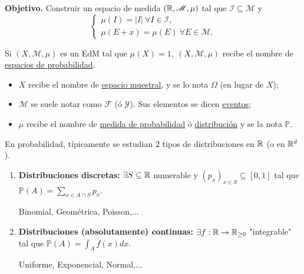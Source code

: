 \noindent \textbf{Objetivo.} Construir un espacio de medida $(\mathbb{R},\mathscr{M},\mu)$ tal que $\mathcal{I} \subseteq \mathscr{M}$ y
\[ \begin{cases}
	\mu(I) = |I|\ \forall I \in \mathcal{I}, \\
	\mu(E+x) = \mu(E) \ \forall E \in \mathscr{M}.
\end{cases} \]

\begin{eg}
	Si $(X,\mathscr{M},\mu)$ es un EdM tal que $\mu(X)=1,\ (X,\mathscr{M},\mu)$ recibe el nombre de \underline{espacios de probabilidad}.
\end{eg}

\begin{itemize}
	\item $X$ recibe el nombre de \underline{espacio muestral}, y se lo nota $\Omega$ (en lugar de $X$);

	\item $\mathscr{M}$ se suele notar como $\mathscr{F}$ (ó $\mathscr{Y}$). Sus elementos se dicen \underline{eventos};

	\item $\mu$ recibe el nombre de \underline{medida de probabilidad} ó \underline{distribución} y se la nota $\mathbb{P}$.
\end{itemize}

\noindent En probabilidad, típicamente se estudian $2$ tipos de distribuciones en $\mathbb{R}$ (o en $\mathbb{R}^d$).

\begin{enumerate}
	\item \textbf{Distribuciones discretas:} $\exists S \subseteq \mathbb{R}$ numerable y $(p_x)_{x \in S} \subseteq [0,1]$ tal que $\mathbb{P}(A) = \sum_{x \in A \cap S} p_x$.
	\begin{eg}
		Binomial, Geométrica, Poisson,...
	\end{eg}

	\item \textbf{Distribuciones (absolutamente) continuas:} $\exists f : \mathbb{R} \to \mathbb{R}_{\geq 0}$ "integrable" tal que $\mathbb{P}(A) = \int_{A} f(x) dx$.
	\begin{eg}
		Uniforme, Exponencial, Normal,...
	\end{eg}
\end{enumerate}

